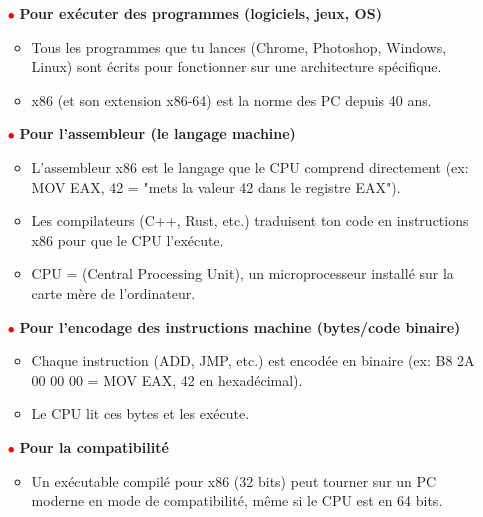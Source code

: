 \documentclass{article}
\begin{document}
\begin{itemize}
    \item[\textbf{\textcolor{red}{$\bullet$}}] \textbf{Pour exécuter des programmes (logiciels, jeux, OS)}
    \begin{itemize}
        \item Tous les programmes que tu lances (Chrome, Photoshop, Windows, Linux) sont écrits pour fonctionner sur une architecture spécifique.
        \item x86 (et son extension x86-64) est la norme des PC depuis 40 ans.
    \end{itemize}
    
    \item[\textbf{\textcolor{red}{$\bullet$}}] \textbf{Pour l'assembleur (le langage machine)}
    \begin{itemize}
        \item L'assembleur x86 est le langage que le CPU comprend directement (ex: MOV EAX, 42 = "mets la valeur 42 dans le registre EAX").
        \item Les compilateurs (C++, Rust, etc.) traduisent ton code en instructions x86 pour que le CPU l'exécute.
        \item CPU = (Central Processing Unit), un microprocesseur installé sur la carte mère de l'ordinateur.
    \end{itemize}
    
    \item[\textbf{\textcolor{red}{$\bullet$}}] \textbf{Pour l'encodage des instructions machine (bytes/code binaire)}
    \begin{itemize}
        \item Chaque instruction (ADD, JMP, etc.) est encodée en binaire (ex: B8 2A 00 00 00 = MOV EAX, 42 en hexadécimal).
        \item Le CPU lit ces bytes et les exécute.
    \end{itemize}
    
    \item[\textbf{\textcolor{red}{$\bullet$}}] \textbf{Pour la compatibilité}
    \begin{itemize}
        \item Un exécutable compilé pour x86 (32 bits) peut tourner sur un PC moderne en mode de compatibilité, même si le CPU est en 64 bits.
    \end{itemize}
\end{itemize}
\end{document}
